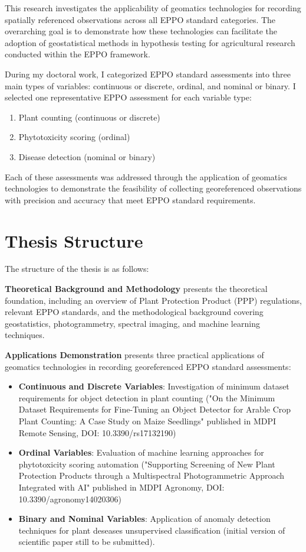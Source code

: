 \documentclass[12pt,a4paper,oneside]{report}
\begin{document}
This research investigates the applicability of geomatics technologies for 
recording spatially referenced observations across all EPPO standard categories. 
The overarching goal is to demonstrate how these technologies can facilitate the 
adoption of geostatistical methods in hypothesis testing for agricultural 
research conducted within the EPPO framework.

During my doctoral work, I categorized EPPO standard assessments into three main 
types of variables: continuous or discrete, ordinal, and nominal or binary. I 
selected one representative EPPO assessment for each variable type:

\begin{enumerate}
\item Plant counting (continuous or discrete)
\item Phytotoxicity scoring (ordinal)
\item Disease detection (nominal or binary)
\end{enumerate}

Each of these assessments was addressed through the application of geomatics 
technologies to demonstrate the feasibility of collecting georeferenced 
observations with precision and accuracy that meet EPPO standard requirements.

\section{Thesis Structure}

The structure of the thesis is as follows:

\textbf{Theoretical Background and Methodology} presents the theoretical 
foundation, including an overview of Plant Protection Product (PPP) regulations, 
relevant EPPO standards, and the methodological background covering geostatistics, 
photogrammetry, spectral imaging, and machine learning techniques.

\textbf{Applications Demonstration} presents three practical applications of 
geomatics technologies in recording georeferenced EPPO standard assessments:
\begin{itemize}
    \item \textbf{Continuous and Discrete Variables}: Investigation of minimum 
    dataset requirements for object detection in plant counting ("On the Minimum 
    Dataset Requirements for Fine-Tuning an
    Object Detector for Arable Crop Plant Counting: A Case Study on Maize 
    Seedlings" published in MDPI Remote Sensing, DOI: 10.3390/rs17132190)
    \item \textbf{Ordinal Variables}: Evaluation of machine learning approaches 
    for phytotoxicity scoring automation ("Supporting Screening of New Plant 
    Protection Products through a Multispectral Photogrammetric Approach 
    Integrated with AI" published in MDPI Agronomy, 
    DOI: 10.3390/agronomy14020306)  
    \item \textbf{Binary and Nominal Variables}: Application of anomaly 
    detection techniques for plant deseases unsupervised classification 
    (initial version of scientific paper still to be submitted). 
\end{itemize}
\end{document}
